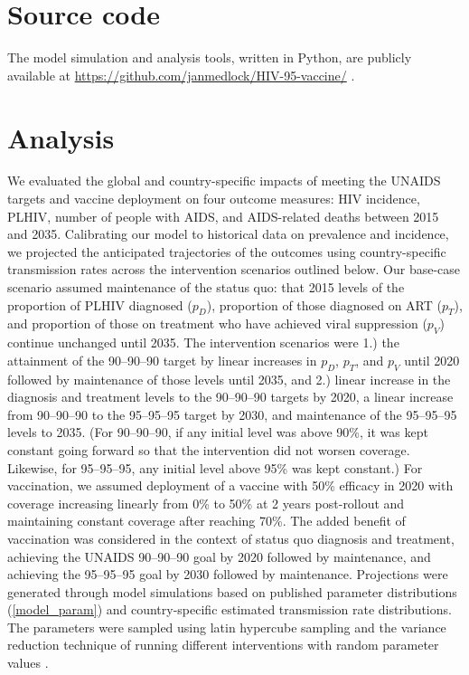 \documentclass{article}
\begin{document}
\section{Source code}

The model simulation and analysis tools, written in Python, are
publicly available at
\url{https://github.com/janmedlock/HIV-95-vaccine/}
\cite{medlock2016-git}.


\section{Analysis}

We evaluated the global and country-specific impacts of meeting the
UNAIDS targets and vaccine deployment on four outcome measures: HIV
incidence, PLHIV, number of people with AIDS, and AIDS-related deaths
between 2015 and 2035. Calibrating our model to historical data on
prevalence and incidence, we projected the anticipated trajectories of
the outcomes using country-specific transmission rates across the
intervention scenarios outlined below.  Our base-case scenario assumed
maintenance of the status quo: that 2015 levels of the proportion of
PLHIV diagnosed ($p_{D}$), proportion of those diagnosed on ART
($p_{T}$), and proportion of those on treatment who have achieved
viral suppression ($p_{V}$) continue unchanged until 2035.  The
intervention scenarios were 1.) the attainment of the 90--90--90
target by linear increases in $p_{D}$, $p_{T}$, and $p_{V}$ until 2020
followed by maintenance of those levels until 2035, and 2.) linear
increase in the diagnosis and treatment levels to the 90--90--90
targets by 2020, a linear increase from 90--90--90 to the 95--95--95
target by 2030, and maintenance of the 95--95--95 levels to 2035. (For
90--90--90, if any initial level was above 90\%, it was kept constant
going forward so that the intervention did not worsen coverage.
Likewise, for 95--95--95, any initial level above 95\% was kept
constant.)  For vaccination, we assumed deployment of a vaccine with
50\% efficacy in 2020 with coverage increasing linearly from 0\% to
50\% at 2 years post-rollout and maintaining constant coverage after
reaching 70\%. The added benefit of vaccination was considered in the
context of status quo diagnosis and treatment, achieving the UNAIDS
90–90–90 goal by 2020 followed by maintenance, and achieving the
95–95–95 goal by 2030 followed by maintenance.  Projections were
generated through model simulations based on published parameter
distributions (\autoref{model_param}) and country-specific estimated
transmission rate distributions. The parameters were sampled using
latin hypercube sampling \cite{blower1994} and the variance reduction
technique of running different interventions with random parameter
values \cite{shechter2006}.
\end{document}

